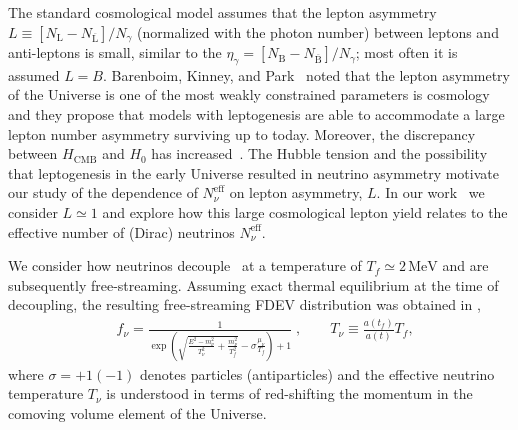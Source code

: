 The standard cosmological model assumes that the lepton asymmetry $L\equiv [N_\mathrm{L}-N_{\overline{\mathrm{L}}}] /N_\gamma $ (normalized with the photon number) 
between leptons and anti-leptons is small, similar to the  $\eta_\gamma=[N_\mathrm{B}-N_{\overline{\mathrm{B}}}]/N_\gamma $; most often it is assumed $L=B$. Barenboim, Kinney, and Park~\cite{Barenboim:2016shh,Barenboim:2017dfq} noted that the lepton asymmetry of the Universe is one of the most weakly constrained parameters is cosmology and they propose that models with leptogenesis are able to accommodate a large lepton number asymmetry surviving up to today. Moreover, the discrepancy between $H_\mathrm{CMB}$ and $H_0$ has increased~\cite{riess2018new,Riess:2018byc,Planck:2018vyg}. The Hubble tension and the possibility that leptogenesis in the early Universe resulted in neutrino asymmetry motivate our study of the dependence of $N_\nu^{\mathrm{eff}}$ on lepton asymmetry, $L$. In our work~\cite{Yang:2018oqg} we consider $L\simeq 1$ and explore how this large cosmological lepton yield relates to the effective number of (Dirac) neutrinos $N^{\mathrm{eff}}_\nu$. 

 We consider how neutrinos decouple~\cite{Birrell:2014gea} at a temperature of $T_f\simeq 2\,\mathrm{MeV}$ and are subsequently free-streaming. Assuming exact thermal equilibrium at the time of decoupling, the resulting free-streaming FDEV distribution was obtained in ,  
\begin{align}
\label{fnudef}
&f_\nu=\frac{1}{\exp{\left(\sqrt{\frac{E^2-m_\nu^2}{T_\nu^2}+\frac{m^2_\nu}{T^2_f}}-\sigma\frac{\mu_\nu}{T_f}\right)+1}}\;,\qquad T_\nu\equiv\frac{a(t_f)}{a(t)}T_f,
\end{align}
where $\sigma=+1(-1)$ denotes particles (antiparticles) and the effective neutrino temperature $T_\nu$ is understood in terms of red-shifting the momentum in the comoving volume element of the Universe.

